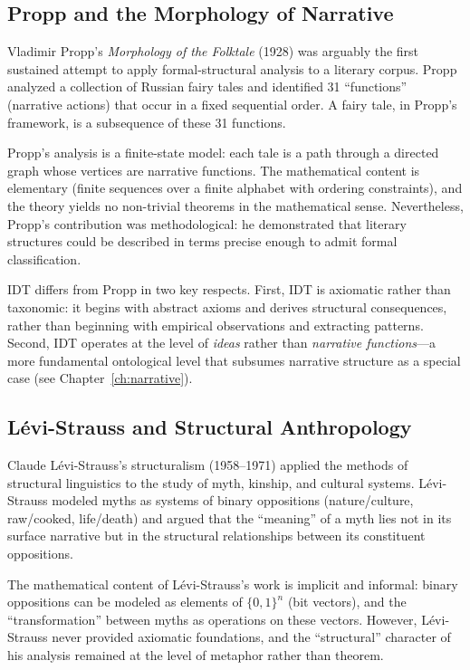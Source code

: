 \documentclass[11pt,openany]{book}
\theoremstyle{definition}
\theoremstyle{plain}
\theoremstyle{remark}
\begin{document}
\subsection{Propp and the Morphology of Narrative}

Vladimir Propp's \emph{Morphology of the Folktale} (1928) was arguably the first sustained attempt to apply formal-structural analysis to a literary corpus. Propp analyzed a collection of Russian fairy tales and identified 31 ``functions'' (narrative actions) that occur in a fixed sequential order. A fairy tale, in Propp's framework, is a subsequence of these 31 functions.

Propp's analysis is a finite-state model: each tale is a path through a directed graph whose vertices are narrative functions. The mathematical content is elementary (finite sequences over a finite alphabet with ordering constraints), and the theory yields no non-trivial theorems in the mathematical sense. Nevertheless, Propp's contribution was methodological: he demonstrated that literary structures could be described in terms precise enough to admit formal classification.

IDT differs from Propp in two key respects. First, IDT is axiomatic rather than taxonomic: it begins with abstract axioms and derives structural consequences, rather than beginning with empirical observations and extracting patterns. Second, IDT operates at the level of \emph{ideas} rather than \emph{narrative functions}---a more fundamental ontological level that subsumes narrative structure as a special case (see Chapter~\ref{ch:narrative}).

\subsection{Lévi-Strauss and Structural Anthropology}

Claude Lévi-Strauss's structuralism (1958--1971) applied the methods of structural linguistics to the study of myth, kinship, and cultural systems. Lévi-Strauss modeled myths as systems of binary oppositions (nature/culture, raw/cooked, life/death) and argued that the ``meaning'' of a myth lies not in its surface narrative but in the structural relationships between its constituent oppositions.

The mathematical content of Lévi-Strauss's work is implicit and informal: binary oppositions can be modeled as elements of $\{0, 1\}^n$ (bit vectors), and the ``transformation'' between myths as operations on these vectors. However, Lévi-Strauss never provided axiomatic foundations, and the ``structural'' character of his analysis remained at the level of metaphor rather than theorem.
\end{document}
